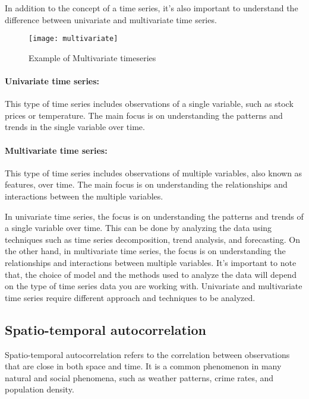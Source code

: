 In addition to the concept of a time series, it's also important to understand the difference between univariate and multivariate time series.
\begin{figure}[H]
  \centering
  \texttt{[image: multivariate]}
  \caption{Example of Multivariate timeseries \cite{mltech}}
\end{figure}

\paragraph{Univariate time series:} This type of time series includes observations of a single variable, such as stock prices or temperature. The main focus is on understanding the patterns and trends in the single variable over time.
\paragraph{Multivariate time series:} This type of time series includes observations of multiple variables, also known as features, over time. The main focus is on understanding the relationships and interactions between the multiple variables.

In univariate time series, the focus is on understanding the patterns and trends of a single variable over time. This can be done by analyzing the data using techniques such as time series decomposition, trend analysis, and forecasting.
On the other hand, in multivariate time series, the focus is on understanding the relationships and interactions between multiple variables. 
It's important to note that, the choice of model and the methods used to analyze the data will depend on the type of time series data you are working with. Univariate and multivariate time series require different approach and techniques to be analyzed.

\subsection{Spatio-temporal autocorrelation}
Spatio-temporal autocorrelation \cite{doi:10.1080/10095020.2019.1643609} refers to the correlation between observations that are close in both space and time. It is a common phenomenon in many natural and social phenomena, such as weather patterns, crime rates, and population density.

